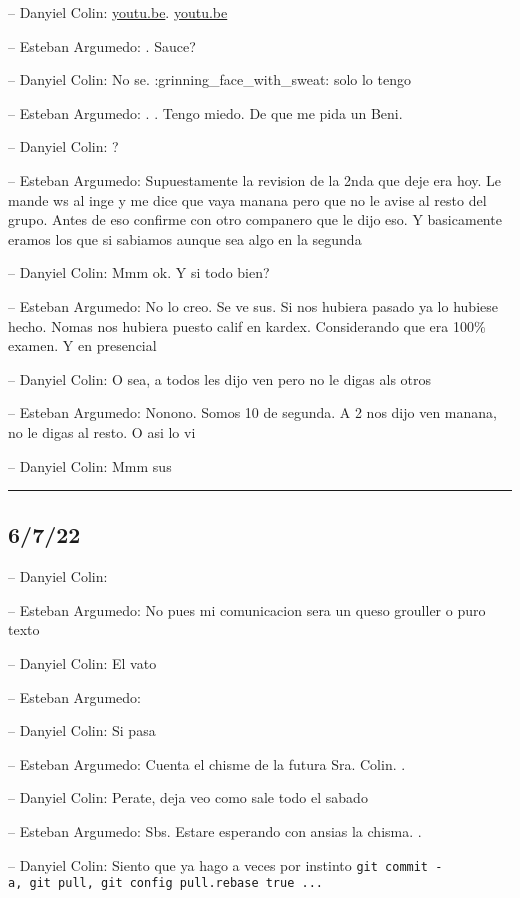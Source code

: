 -- Danyiel Colin: \href{https://youtu.be/Xm7jeHmk0h0}{youtu.be}.
\href{https://youtu.be/03H1cWj2Kfc}{youtu.be}

-- Esteban Argumedo: . Sauce?

-- Danyiel Colin: No se. :grinning\_face\_with\_sweat: solo lo tengo

-- Esteban Argumedo: . . Tengo miedo. De que me pida un Beni.

-- Danyiel Colin: ?

-- Esteban Argumedo: Supuestamente la revision de la 2nda que deje era
hoy. Le mande ws al inge y me dice que vaya manana pero que no le avise
al resto del grupo. Antes de eso confirme con otro companero que le dijo
eso. Y basicamente eramos los que si sabiamos aunque sea algo en la
segunda

-- Danyiel Colin: Mmm ok. Y si todo bien?

-- Esteban Argumedo: No lo creo. Se ve sus. Si nos hubiera pasado ya lo
hubiese hecho. Nomas nos hubiera puesto calif en kardex. Considerando
que era 100\% examen. Y en presencial

-- Danyiel Colin: O sea, a todos les dijo ven pero no le digas als otros

-- Esteban Argumedo: Nonono. Somos 10 de segunda. A 2 nos dijo ven
manana, no le digas al resto. O asi lo vi

-- Danyiel Colin: Mmm sus

\begin{center}\rule{0.5\linewidth}{0.5pt}\end{center}

\hypertarget{section-97}{%
\subsection{6/7/22}\label{section-97}}

-- Danyiel Colin:

-- Esteban Argumedo: No pues mi comunicacion sera un queso grouller o
puro texto

-- Danyiel Colin: El vato

-- Esteban Argumedo:

-- Danyiel Colin: Si pasa

-- Esteban Argumedo: Cuenta el chisme de la futura Sra. Colin. .

-- Danyiel Colin: Perate, deja veo como sale todo el sabado

-- Esteban Argumedo: Sbs. Estare esperando con ansias la chisma. .

-- Danyiel Colin: Siento que ya hago a veces por instinto
\texttt{git\ commit\ -a,\ git\ pull,\ git\ config\ pull.rebase\ true\ ...}

